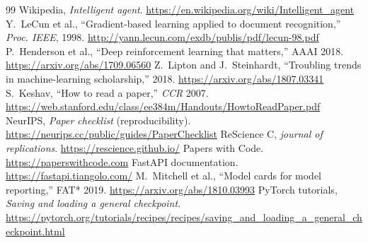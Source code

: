 \begin{thebibliography}{99}
 Wikipedia, \emph{Intelligent agent}. \url{https://en.wikipedia.org/wiki/Intelligent_agent}
 Y.~LeCun et al., ``Gradient-based learning applied to document recognition,'' \emph{Proc. IEEE}, 1998. \url{http://yann.lecun.com/exdb/publis/pdf/lecun-98.pdf}
 P.~Henderson et al., ``Deep reinforcement learning that matters,'' AAAI 2018. \url{https://arxiv.org/abs/1709.06560}
 Z.~Lipton and J.~Steinhardt, ``Troubling trends in machine-learning scholarship,'' 2018. \url{https://arxiv.org/abs/1807.03341}
 S.~Keshav, ``How to read a paper,'' \emph{CCR} 2007. \url{https://web.stanford.edu/class/ee384m/Handouts/HowtoReadPaper.pdf}
 NeurIPS, \emph{Paper checklist} (reproducibility). \url{https://neurips.cc/public/guides/PaperChecklist}
 ReScience C, \emph{journal of replications}. \url{https://rescience.github.io/}
 Papers with Code. \url{https://paperswithcode.com}
 FastAPI documentation. \url{https://fastapi.tiangolo.com/}
 M.~Mitchell et al., ``Model cards for model reporting,'' FAT* 2019. \url{https://arxiv.org/abs/1810.03993}
 PyTorch tutorials, \emph{Saving and loading a general checkpoint}. \url{https://pytorch.org/tutorials/recipes/recipes/saving_and_loading_a_general_checkpoint.html}
\end{thebibliography}
